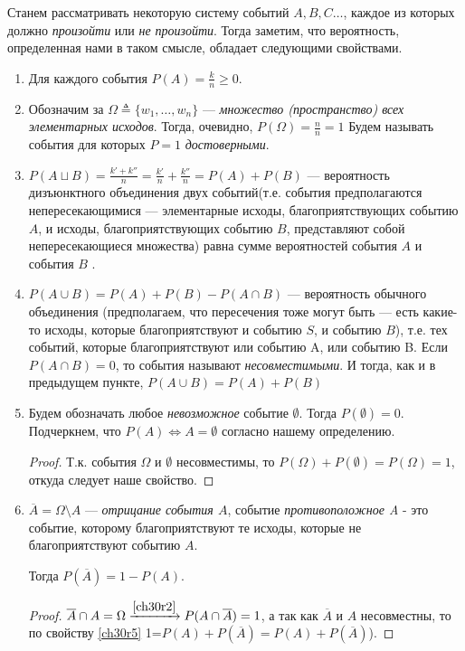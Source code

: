 Станем рассматривать некоторую систему событий $A,B,C\dots $, каждое из которых должно \textit{произойти} или \textit{не произойти}. Тогда заметим, что вероятность, определенная нами в таком смысле, обладает следующими свойствами.
\begin{enumerate}
\item 
Для каждого события $P(A)=\frac{k}{n}\ge 0$.
\item \label{ch30r2}
Обозначим за $\Omega \triangleq \{w_1, \dots,w_n\}$ --- \textit{множество (пространство) всех элементарных исходов}. Тогда, очевидно, $P(\Omega)=\frac{n}{n}=1$ Будем называть события для которых $P=1$ \textit{достоверными}. 

\item 
$P(A\sqcup B)=\frac{k'+k''}{n}=\frac{k'}{n}+\frac{k''}{n}=P(A)+P(B)$ --- вероятность дизъюнктного объединения двух событий(т.е. события предполагаются непересекающимися --- элементарные исходы, благоприятствующих событию $A$, и исходы, благоприятствующих событию $B$, представляют собой непересекающиеся множества) равна сумме вероятностей события $A$ и события $B$ .
\item \label{ch30r5}
$P(A\cup B)=P(A)+P(B)-P(A\cap B)$ --- вероятность обычного объединения (предполагаем, что пересечения тоже могут быть --- есть какие-то исходы, которые благоприятствуют и событию $S$, и событию $B$), т.е. тех событий, которые благоприятствуют или событию A, или событию B. Если $P(A\cap B)=0$, то события называют \textit{несовместимыми}. И тогда, как и в предыдущем пункте, $P(A\cup B)=P(A)+P(B)$
\item
Будем обозначать любое \textit{невозможное} событие $\emptyset$. Тогда $P(\emptyset)=0$. Подчеркнем, что $P(A) \Leftrightarrow A = \emptyset$ согласно нашему определению. 
\begin{proof}
Т.к. события $\Omega$ и $\emptyset$ несовместимы, то $P(\Omega)+P(\emptyset)=P(\Omega)=1$, откуда следует наше свойство.
\end{proof}

\item
$\overline{A}=\Omega\setminus A$ --- \textit{отрицание события $A$}, событие \textit{противоположное A} - это событие, которому благоприятствуют те исходы, которые не благоприятствуют событию $A$. 

Тогда $P(\overline{A})=1-P(A)$.
\begin{proof}
$\overline{A}\cap A=\Omega\xrightarrow{\ref{ch30r2}}P(A\cap\overline{A}) = 1$, а так как $\overline{A}$ и $A$ несовместны, то по свойству \ref{ch30r5}  1=$P(A)+P(\overline{A}) = P(A)+P(\overline{A})$).
\end{proof}


\end{enumerate}
